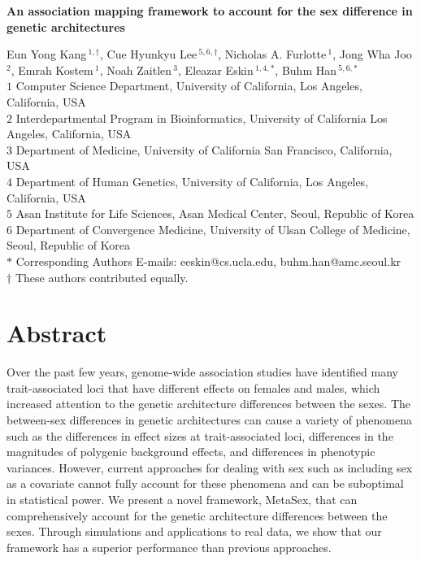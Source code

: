 \documentclass[11pt]{article}
\date{}
\newcommand{\bcomment}[1]{{\bf{\emph{\large{[Buhm's comment:#1]}}}}}
\begin{document}
\begin{flushleft}
{\Large
\textbf{An association mapping framework  to account for the sex difference in genetic architectures
}
}



    Eun Yong Kang\,$^{1,\dagger}$,
    Cue Hyunkyu Lee\,$^{5,6,\dagger}$,
    Nicholas A. Furlotte\,$^{1}$,
    Jong Wha Joo\,$^{2}$,
    Emrah Kostem\,$^{1}$,
    Noah Zaitlen\,$^{3}$, 
    Eleazar Eskin\,$^{1,4,\ast}$,
    Buhm Han\,$^{5,6,\ast}$\\
    {\bf $1$} Computer Science Department, University of California, Los Angeles, California, USA\\
    {\bf $2$} Interdepartmental Program in Bioinformatics, University of California Los Angeles, California, USA\\
    {\bf $3$} Department of Medicine, University of California San Francisco, California, USA\\
    {\bf $4$} Department of Human Genetics, University of California, Los Angeles, California, USA\\
    {\bf $5$} Asan Institute for Life Sciences, Asan Medical Center, Seoul, Republic of Korea\\ 
    {\bf $6$} Department of Convergence Medicine, University of Ulsan College of Medicine, Seoul, Republic of Korea\\ 
$\ast$ Corresponding Authors E-mails: eeskin@cs.ucla.edu, buhm.han@amc.seoul.kr\\
$\dagger$ These authors contributed equally.
\end{flushleft}

\clearpage
\section*{Abstract}
Over the past few years, 
genome-wide association studies have identified many trait-associated loci
that have different effects on females and males,
which increased attention to the genetic architecture differences between the sexes.
The between-sex differences in genetic architectures can cause a 
variety of phenomena 
such as 
the differences in effect sizes at trait-associated loci,
differences in the magnitudes of polygenic background effects,
and
differences in phenotypic variances. 
However, 
current approaches for dealing with sex such as including sex as a covariate
cannot fully account for these phenomena and can be  suboptimal in statistical power.
We present a novel framework, MetaSex, that can
comprehensively account for the genetic architecture differences between the sexes.
Through simulations and applications to real data, 
we show that our framework  has a superior performance than previous approaches.
\end{document}
